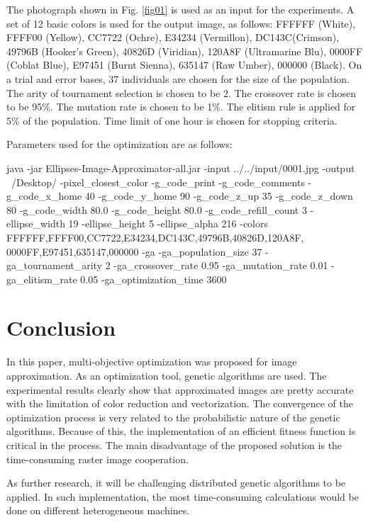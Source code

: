 \documentclass[conference]{IEEEtran}
\begin{document}
The photograph shown in Fig. \ref{fig01} is used as an input for the experiments. A set of 12 basic colors is used for the output image, as follows:   FFFFFF (White), FFFF00 (Yellow), CC7722 (Ochre), E34234 (Vermillon), DC143C(Crimson), 49796B (Hooker's Green), 40826D (Viridian), 120A8F (Ultramarine Blu), 0000FF (Coblat Blue), E97451 (Burnt Sienna), 635147 (Raw Umber), 000000 (Black). On a trial and error bases, 37 individuals are chosen for the size of the population. The arity of tournament selection is chosen to be 2. The crossover rate is chosen to be 95\%. The mutation rate is chosen to be 1\%. The elitism rule is applied for 5\% of the population. Time limit of one hour is chosen for stopping criteria.

Parameters used for the optimization are as follows:

\begin{verbnobox}[\tiny]
java -jar Ellipses-Image-Approximator-all.jar -input ../../input/0001.jpg 
-output ~/Desktop/ -pixel_closest_color -g_code_print -g_code_comments 
-g_code_x_home 40 -g_code_y_home 90 -g_code_z_up 35 
-g_code_z_down 80 -g_code_width 80.0 -g_code_height 80.0 
-g_code_refill_count 3 -ellipse_width 19 -ellipse_height 5 -ellipse_alpha 216 
-colors FFFFFF,FFFF00,CC7722,E34234,DC143C,49796B,40826D,120A8F,
0000FF,E97451,635147,000000 -ga -ga_population_size 37 
-ga_tournament_arity 2 -ga_crossover_rate 0.95 -ga_mutation_rate 0.01 
-ga_elitism_rate 0.05 -ga_optimization_time 3600
\end{verbnobox}

\section{Conclusion}

In this paper, multi-objective optimization was proposed for image approximation. As an optimization tool, genetic algorithms are used. The experimental results clearly show that approximated images are pretty accurate with the limitation of color reduction and vectorization. The convergence of the optimization process is very related to the probabilistic nature of the genetic algorithms. Because of this, the implementation of an efficient fitness function is critical in the process. The main disadvantage of the proposed solution is the time-consuming raster image cooperation. 

As further research, it will be challenging distributed genetic algorithms to be applied. In such implementation, the most time-consuming calculations would be done on different heterogeneous machines. 
\end{document}

